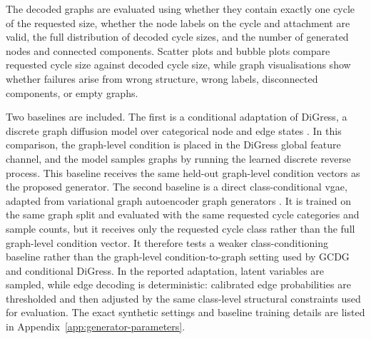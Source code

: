 The decoded graphs are evaluated using whether they contain exactly one cycle
of the requested size, whether the node labels on the cycle and attachment are
valid, the full distribution of decoded cycle sizes, and the number of generated
nodes and connected components. Scatter plots and bubble plots compare requested
cycle size against decoded cycle size, while graph visualisations show whether
failures arise from wrong structure, wrong labels, disconnected components, or
empty graphs.

Two baselines are included. The first is a conditional adaptation of DiGress,
a discrete graph diffusion model over categorical node and edge states
\citep{vignac2022digress}. In this comparison, the graph-level condition is
placed in the DiGress global feature channel, and the model samples graphs by
running the learned discrete reverse process. This baseline receives the same
held-out graph-level condition vectors as the proposed generator. The second
baseline is a direct class-conditional \gls{vgae}, adapted from variational graph
autoencoder graph generators \citep{kipf2016vgae,simonovsky2018graphvae}.
It is trained on the same graph split and evaluated with the same requested
cycle categories and sample counts, but it receives only the requested cycle
class rather than the full graph-level condition vector. It therefore tests a
weaker class-conditioning baseline rather than the graph-level condition-to-graph
setting used by GCDG and conditional DiGress. In the reported
adaptation, latent variables are sampled, while edge decoding is deterministic:
calibrated edge probabilities are thresholded and then adjusted by the same
class-level structural constraints used for evaluation. The exact synthetic
settings and baseline training details are listed in
Appendix~\ref{app:generator-parameters}.

